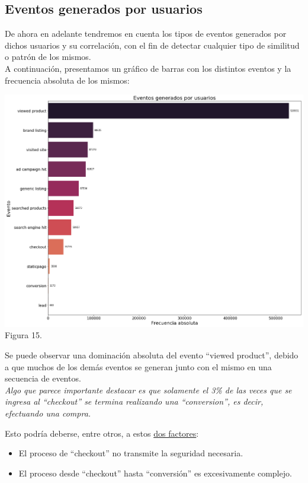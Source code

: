 \documentclass[a4paper ,12pt]{article}
\begin{document}
\subsection{Eventos generados por usuarios}
De ahora en adelante tendremos en cuenta los tipos de eventos generados por dichos usuarios y su correlación, con el fin de detectar cualquier tipo de similitud o patrón de los mismos.\\


A continuación, presentamos un gráfico de barras con los distintos eventos y la frecuencia absoluta de los mismos:

\begin{center}
	\includegraphics[width=1.0\linewidth]{output_58_0}
	Figura 15.
	
\end{center}
Se puede observar una dominación absoluta del evento “viewed product”, debido a que muchos de los demás eventos se generan junto con el mismo en una secuencia de eventos.\\


\emph{
Algo que parece importante destacar es que solamente el 3\% de las veces que se ingresa al “checkout” se termina realizando una “conversion”, es decir, efectuando una compra.\\}


Esto podría deberse, entre otros, a estos \underline{dos factores}:

\begin{itemize}
	\item El proceso de “checkout” no transmite la seguridad necesaria.
	
	\item El proceso desde “checkout” hasta “conversión” es excesivamente complejo.
	
\end{itemize} 
\end{document}
